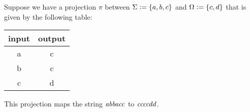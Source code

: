 \begin{examplebox}
    Suppose we have a projection $\pi$ between $\Sigma \mathrel{\mathop:}= \left \{ a,b,c \right \}$ and $\Omega \mathrel{\mathop:}= \left \{ c,d \right \}$ that is given by the following table:
    \begin{center}
        \begin{tabular}{cc}
            \toprule
            \textbf{input} & \textbf{output}\\
            \midrule
            a & c\\
            b & c\\
            c & d\\
            \bottomrule
        \end{tabular}
    \end{center}
    This projection maps the string $\mathit{abbacc}$ to $\mathit{ccccdd}$.
    

\end{examplebox}
